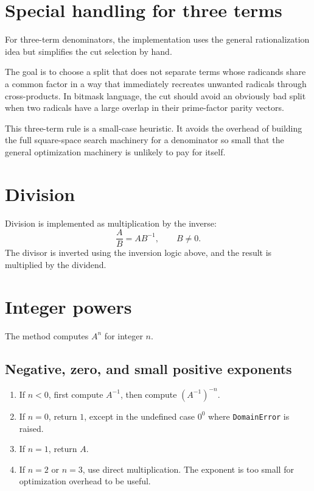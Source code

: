 \documentclass[11pt]{article}
\begin{document}
\section{Special handling for three terms}

For three-term denominators, the implementation uses the general rationalization idea but simplifies the cut selection by hand.

The goal is to choose a split that does not separate terms whose radicands share a common factor in a way that immediately recreates unwanted radicals through cross-products. In bitmask language, the cut should avoid an obviously bad split when two radicals have a large overlap in their prime-factor parity vectors.

This three-term rule is a small-case heuristic. It avoids the overhead of building the full square-space search machinery for a denominator so small that the general optimization machinery is unlikely to pay for itself.

\section{Division}

Division is implemented as multiplication by the inverse:
\begin{equation}
  \frac{A}{B}=A B^{-1}, \qquad B\neq0.
\end{equation}
The divisor is inverted using the inversion logic above, and the result is multiplied by the dividend.

\section{Integer powers}

The method computes \(A^n\) for integer \(n\).

\subsection{Negative, zero, and small positive exponents}

\begin{enumerate}[label=\arabic*.]
  \item If \(n<0\), first compute \(A^{-1}\), then compute \((A^{-1})^{-n}\).
  \item If \(n=0\), return \(1\), except in the undefined case \(0^0\) where \texttt{DomainError} is raised.
  \item If \(n=1\), return \(A\).
  \item If \(n=2\) or \(n=3\), use direct multiplication. The exponent is too small for optimization overhead to be useful.
\end{enumerate}
\end{document}
